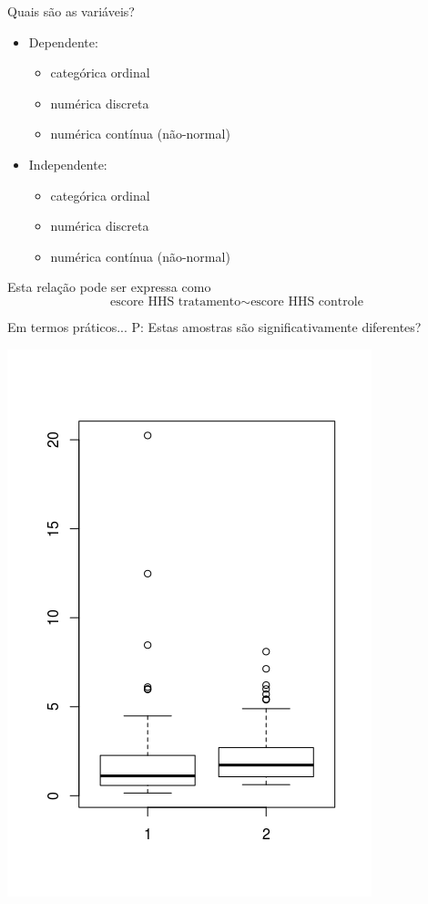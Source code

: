 \documentclass{beamer}
\begin{document}
\begin{frame}{\scriptsize Quais são as variáveis?}
  \begin{itemize}
    \footnotesize
  \item Dependente:
    \begin{itemize}
      \scriptsize
    \item categórica ordinal
    \item numérica discreta
    \item numérica contínua (não-normal)
    \end{itemize}
  \item Independente:
    \begin{itemize}
      \scriptsize
    \item categórica ordinal
    \item numérica discreta
    \item numérica contínua (não-normal)
    \end{itemize}
  \end{itemize}
  \vfill
  \begin{block}{Esta relação pode ser expressa como}
    \footnotesize
    \begin{displaymath}
      \text{escore HHS tratamento} \sim \text{escore HHS controle}
    \end{displaymath}
  \end{block}
\end{frame}

\begin{frame}{\scriptsize Em termos práticos...}
  \footnotesize
P: Estas amostras são significativamente diferentes?

  \centering
  \includegraphics[height=\textheight]{Cap37-38/2samples-bp}
\end{frame}
\end{document}
